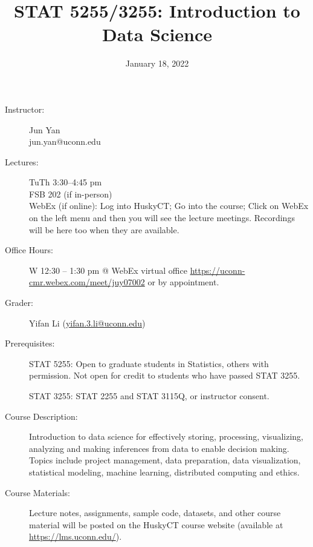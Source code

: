\documentclass{article}
\begin{document}

\title{STAT 5255/3255: Introduction to Data Science}
\date{January 18, 2022}

\maketitle

\thispagestyle{fancy}

\begin{multicols}{2}
\begin{description}
\item[Instructor:]
  Jun Yan\\
  jun.yan@uconn.edu

\item[Lectures:] 
  TuTh 3:30--4:45 pm\\
  FSB 202 (if in-person)\\
  WebEx (if online):  
  Log into HuskyCT; Go into the course; Click on WebEx on the left menu and
  then you will see the lecture meetings. Recordings will be here too when
  they are available.

\item[Office Hours:] 
  W 12:30 -- 1:30 pm @ WebEx virtual office
  \url{https://uconn-cmr.webex.com/meet/juy07002}
  or by appointment.

\item[Grader:] Yifan Li (\href{mailto:
   yifan.3.li@uconn.edu}{yifan.3.li@uconn.edu})
  
\item[Prerequisites:]
  STAT 5255: Open to graduate students in Statistics, others with
  permission. Not open for credit to students who have passed STAT
  3255.

  STAT 3255: STAT 2255 and STAT 3115Q, or instructor consent.
    
\item[Course Description:]
  Introduction to data science for effectively storing, processing,
  visualizing, analyzing and making inferences from data to enable
  decision making. Topics include project management, data
  preparation, data visualization, statistical modeling, machine
  learning, distributed computing and ethics.
  
\item[Course Materials:]
  Lecture notes, assignments, sample code, datasets, and other course
  material will be posted on the HuskyCT course website (available at
  \url{https://lms.uconn.edu/}).
  

\end{description}
\end{multicols}
\end{document}
